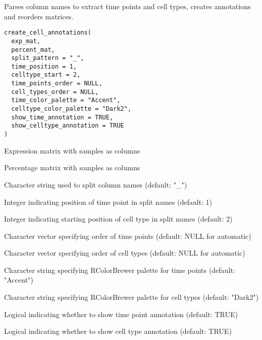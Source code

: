 \documentclass[a4paper]{book}
\begin{document}
%
\begin{Description}
Parses column names to extract time points and cell types, creates annotations and reorders matrices.
\end{Description}
%
\begin{Usage}
\begin{verbatim}
create_cell_annotations(
  exp_mat,
  percent_mat,
  split_pattern = "_",
  time_position = 1,
  celltype_start = 2,
  time_points_order = NULL,
  cell_types_order = NULL,
  time_color_palette = "Accent",
  celltype_color_palette = "Dark2",
  show_time_annotation = TRUE,
  show_celltype_annotation = TRUE
)
\end{verbatim}
\end{Usage}
%
\begin{Arguments}
\begin{ldescription}
\item[\code{exp\_mat}] Expression matrix with samples as columns

\item[\code{percent\_mat}] Percentage matrix with samples as columns

\item[\code{split\_pattern}] Character string used to split column names (default: "\_")

\item[\code{time\_position}] Integer indicating position of time point in split names (default: 1)

\item[\code{celltype\_start}] Integer indicating starting position of cell type in split names (default: 2)

\item[\code{time\_points\_order}] Character vector specifying order of time points (default: NULL for automatic)

\item[\code{cell\_types\_order}] Character vector specifying order of cell types (default: NULL for automatic)

\item[\code{time\_color\_palette}] Character string specifying RColorBrewer palette for time points (default: "Accent")

\item[\code{celltype\_color\_palette}] Character string specifying RColorBrewer palette for cell types (default: "Dark2")

\item[\code{show\_time\_annotation}] Logical indicating whether to show time point annotation (default: TRUE)

\item[\code{show\_celltype\_annotation}] Logical indicating whether to show cell type annotation (default: TRUE)
\end{ldescription}
\end{Arguments}
\end{document}
